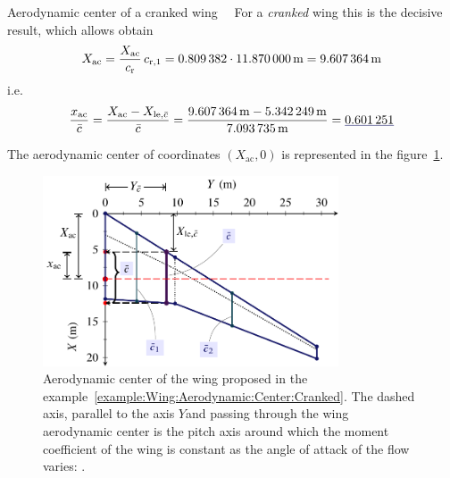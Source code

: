 \documentclass[[12pt,twoside]{book}
\begin{document}
\begin{myExampleX}{Aerodynamic center of a cranked wing}{\ \myIconGraph\ }
For a \emph{cranked} wing this is the decisive result, which allows
obtain
\[
X_{\mathrm{ac}} = \frac{X_{\mathrm{ac}}}{c_\mathrm{r}} \, c_{\mathrm{r},1}
  = \SI[round-precision=3]{\myXACOverChordRootDatcomWing}{}
    \cdot \SI[round-precision=2]{\myChordRootWingIMT}{\metre}
  = \SI[round-precision=2]{\myACWingToApexWingMT}{\metre} 
\]
i.e.
\[
\frac{x_{\mathrm{ac}}}{\bar{c}}
  = 
  \frac{
    X_{\mathrm{ac}} - X_{\mathrm{le},\bar{c}}
  }{
    \bar{c}
  }
  =
  \frac{
    \SI[round-precision=2]{\myACWingToApexWingMT}{\metre}
      - \SI[round-precision=2]{\myXXMACLEToApexWingCrankedMT}{\metre}
  }{
    \SI[round-precision=2]{\myMACWingCrankedMT}{\metre}
  }
  =
  \mathunderline{mydarkblue}{ \SI[round-precision=3]{\myXsiACWing}{} }  
\]

The aerodynamic center of coordinates $(X_\mathrm{ac},0)$
is represented in the figure~\ref{fig:Wing:Aerodynamic:Center:Cranked:Results}.

\begin{figure}[t]%
    \includegraphics[width=0.78\textwidth]{Chapter_2/aerodynamic_center_of_a_cranked_wing/wing_ac_cranked_1_drawing.pdf}
  \caption{
         Aerodynamic center of the wing proposed in the example~\ref{example:Wing:Aerodynamic:Center:Cranked}. The dashed axis,
           parallel to the axis $Y$and passing through the wing aerodynamic center
           is the pitch axis around which the moment coefficient
           of the wing is constant as the angle of attack of the flow varies:
          .
  }
  \label{fig:Wing:Aerodynamic:Center:Cranked:Results}%
\end{figure}
\end{myExampleX}
\end{document}
